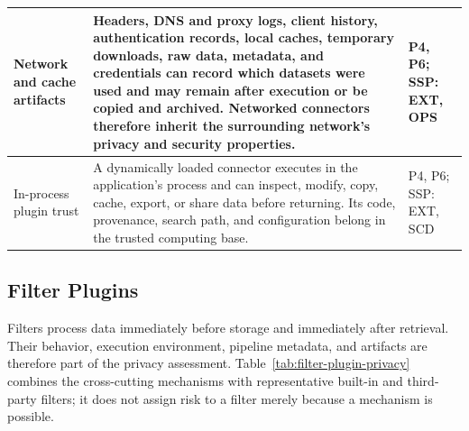 \documentclass[../main.tex]{subfiles}
\begin{document}
\begin{longtable}{@{}p{}p{}p{}@{}}
Network and cache artifacts &
Headers, DNS and proxy logs, client history, authentication records, local
caches, temporary downloads, raw data, metadata, and credentials can record
which datasets were used and may remain after execution or be copied and
archived. Networked connectors therefore inherit the surrounding network's
privacy and security properties. &
P4, P6; SSP: EXT, OPS \\
\hline

In-process plugin trust &
A dynamically loaded connector executes in the application's process and can
inspect, modify, copy, cache, export, or share data before returning. Its code,
provenance, search path, and configuration belong in the trusted computing
base. &
P4, P6; SSP: EXT, SCD \\
\hline
\end{longtable}
\endgroup

\subsection{Filter Plugins}

Filters process data immediately before storage and immediately after
retrieval. Their behavior, execution environment, pipeline metadata, and
artifacts are therefore part of the privacy assessment. Table~\ref{tab:filter-plugin-privacy}
combines the cross-cutting mechanisms with representative built-in and
third-party filters; it does not assign risk to a filter merely because a
mechanism is possible.
\end{document}
